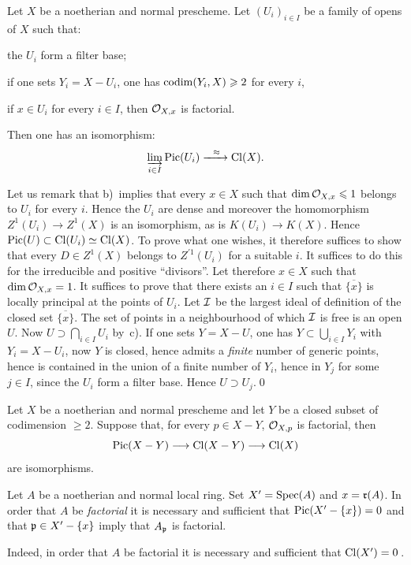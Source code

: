\begin{propositionblah} \label{XI.3.7.1}
Let $X$ be a noetherian and normal prescheme. Let $(U_i)_{i\in I}$ be a family of opens of $X$ such that:
\begin{enumeratea}
\item
the $U_i$ form a filter base;
\item
if one sets $Y_i=X-U_i$, one has $\operatorname{codim}(Y_i, X)\geqslant 2$ for every $i$,
\item
if $x\in U_i$ for every $i\in I$, then $\mathcal{O}_{X, x}$ is factorial.
\end{enumeratea}
\noindent
Then one has an isomorphism:
\[
\varinjlim_{i\in I}\Pic(U_i)\lto{\approx}\Cl(X){\quoi}.
\]
\end{propositionblah}
Let us remark that b)~implies that every $x\in X$ such that $\dim\mathcal{O}_{X, x}\leqslant 1$ belongs to $U_i$ for every $i$. Hence the $U_i$ are dense and moreover the homomorphism $Z^1(U_i)\to Z^1(X)$ is an isomorphism, as is $K(U_i)\to K(X)$. Hence $\operatorname{Pic}(U)\subset \operatorname{Cl}(U_i) \simeq \operatorname{Cl}(X)$. To prove what one wishes, it therefore suffices to show that every $D\in Z^1(X)$ belongs to $Z^{\prime1}(U_i)$ for a suitable $i$. It suffices to do this for the irreducible and positive ``divisors''. Let therefore $x\in X$ such that $\dim\mathcal{O}_{X, x}=1$. It suffices to prove that there exists an $i\in I$ such that $\overline{\{x\}}$ is locally principal at the points of $U_i$. Let ${\mathcal I}$ be the largest ideal of definition of the closed set $\overline{\{x\}}$. The set of points in a neighbourhood of which ${\mathcal I}$ is free is an open $U$. Now $U\supset \bigcap_{i\in I}U_i$ by~c). If one sets $Y=X-U$, one has $Y\subset \bigcup_{i\in I}Y_i$ with $Y_i=X-U_i$, now $Y$ is closed, hence admits a \emph{finite} number of generic points, hence is contained in the union of a finite number of $Y_i$, hence in $Y_j$ for some $j\in I$, since the $U_i$ form a filter base. Hence $U\supset U_j$.\qed

\begin{corollary} \label{XI.3.8}
Let $X$ be a noetherian and normal prescheme and let $Y$ be a closed subset of codimension $\geq 2$. Suppose that, for every $p\in X-Y$, ${\mathcal O}_{X, p}$ is factorial, then
\[
\Pic(X-Y)\to\Cl(X-Y)\to\Cl(X)
\]
are isomorphisms.
\end{corollary}

\begin{corollary} \label{XI.3.9}
Let $A$ be a noetherian and normal local ring. Set $X'=\operatorname{Spec}(A)$ and $x = \mathfrak{r}(A)$. In order that $A$ be \emph{factorial} it is necessary and sufficient that $\operatorname{Pic}(X'-\{x\})=0$ and that $\mathfrak{p}\in X'-\{x\}$ imply that $A_{\mathfrak{p}}$ is factorial.
\end{corollary}
Indeed, in order that $A$ be factorial it is necessary and sufficient that $\operatorname{Cl}(X')=0$\,.

